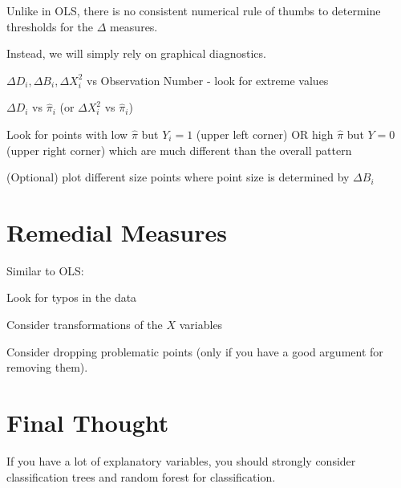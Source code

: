 \documentclass[12pt]{../notes}
\begin{document}
\nspace 
Unlike in OLS, there is no consistent numerical rule of thumbs to determine thresholds for the $\Delta$ measures. 

\nspace
Instead, we will simply rely on graphical diagnostics. 
\bi
\item $\Delta D_i, \Delta B_i, \Delta X_i^2$ vs Observation Number - look for extreme values 
\item $\Delta D_i$ vs $\hat{\pi}_i$ (or $\Delta X_i^2$ vs $\hat{\pi}_i$)
\bi
\item Look for points with low $\hat{\pi}$ but $Y_i = 1$ (upper left corner) OR high $\hat{\pi}$ but $Y=0$ (upper right corner) which are much different than the overall pattern
\item (Optional) plot different size points where point size is determined by $\Delta B_i$
\ei
\ei

\section{Remedial Measures}
Similar to OLS:
\bi
\item Look for typos in the data
\item Consider transformations of the $X$ variables
\item Consider dropping problematic points (only if you have a good argument for removing them). 
\ei

\section{Final Thought}
If you have a lot of explanatory variables, you should strongly consider classification trees and random forest for classification. 






















\end{document}
